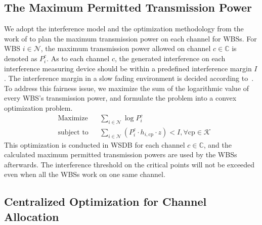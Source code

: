 \documentclass[times]{ettauth}
\theoremstyle{mytheoremstyle}
\theoremstyle{mytheoremstyle}
\theoremstyle{mytheoremstyle}
\begin{document}
\subsection{The Maximum Permitted Transmission Power}
\label{powermap}

We adopt the interference model and the optimization methodology from the work of \cite{multipleIntf_pimrc11} to plan the maximum transmission power on each channel for WBSs.
%
For WBS $i\in \mathcal{N}$, the maximum transmission power allowed on channel $c\in \mathbb{C}$ is denoted as $P_i^c$. 
As to each channel $c$, the generated interference on each interference measuring device should be within a predefined interference margin $I$.
The interference margin in a slow fading environment is decided according to~\cite{aggregate_interference_shadow_fading_2010}.
To address this fairness issue, we maximize the sum of the logarithmic value of every WBS's transmission power, and formulate the problem into a convex optimization problem.
	\begin{equation}
		\label{cvx}
		\begin{aligned}
		& {\text{Maximize}}
		& & \sum_{i\in \mathcal{N}} \log P^c_i \\
		& \text{subject to}
		& & \sum_{i\in \mathcal{N}} (P^c_i \cdot h_{i,\text{cp}}\cdot z) < I, \forall\text{cp} \in \mathcal{K}
		\end{aligned}
	\end{equation}
This optimization is conducted in WSDB for each channel $c\in \mathbb{C}$, and the calculated maximum permitted transmission powers are used by the WBSs afterwards.
The interference threshold on the critical points will not be exceeded even when all the WBSs work on one same channel.



\subsection{Centralized Optimization for Channel Allocation}
\label{03_centralized_ca}
\end{document}
